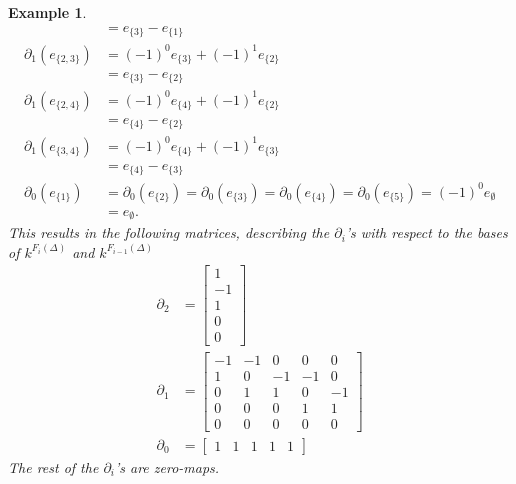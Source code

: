 \documentclass[11pt,a4paper,twoside, openright]{report}
\newtheorem{myex}[mythm]{Example}
\begin{document}
\begin{myex}
\begin{align*}
&=e_{\{3\}}-e_{\{1\}}\\
\partial_1(e_{\{2,3\}})&=(-1)^0e_{\{3\}}+(-1)^1e_{\{2\}}\\
&=e_{\{3\}}-e_{\{2\}}\\
\partial_1(e_{\{2,4\}})&=(-1)^0e_{\{4\}}+(-1)^1e_{\{2\}}\\
&=e_{\{4\}}-e_{\{2\}}\\
\partial_1(e_{\{3,4\}})&=(-1)^0e_{\{4\}}+(-1)^1e_{\{3\}}\\
&=e_{\{4\}}-e_{\{3\}}\\
\partial_0(e_{\{1\}})&=\partial_0(e_{\{2\}})=\partial_0(e_{\{3\}})=\partial_0(e_{\{4\}})=\partial_0(e_{\{5\}})=(-1)^0e_{\emptyset}\\
&=e_{\emptyset}.
\end{align*}
This results in the following matrices, describing the $\partial_i$'s with respect to the bases of $k^{F_i(\Delta)}$ and $k^{F_{i-1}(\Delta)}$
\begin{align*}
\partial_2&=
\begin{bmatrix}
1\\
-1\\
1\\
0\\
0
\end{bmatrix}\\
\partial_1&=
\begin{bmatrix}
-1 & -1 & 0 & 0 & 0\\
1 & 0 & -1 & -1 & 0\\
0 & 1 & 1 & 0 & -1\\
0 & 0 & 0 & 1 & 1\\
0 & 0 & 0 & 0 & 0
\end{bmatrix}\\
\partial_0&=
\begin{bmatrix}
1 & 1 & 1 & 1 & 1 
\end{bmatrix}
\end{align*}
The rest of the $\partial_i$'s are zero-maps.


\end{myex}
\end{document}
